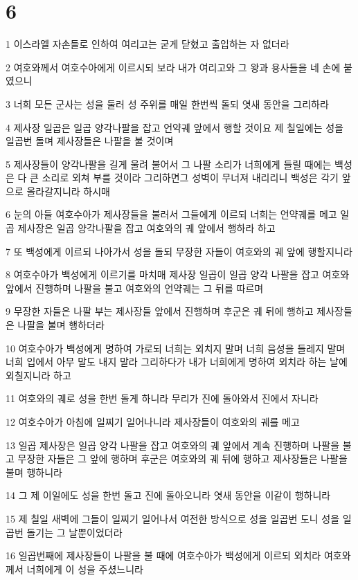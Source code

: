 \chapter{6}

\par 1 이스라엘 자손들로 인하여 여리고는 굳게 닫혔고 출입하는 자 없더라
\par 2 여호와께서 여호수아에게 이르시되 보라 내가 여리고와 그 왕과 용사들을 네 손에 붙였으니
\par 3 너희 모든 군사는 성을 둘러 성 주위를 매일 한번씩 돌되 엿새 동안을 그리하라
\par 4 제사장 일곱은 일곱 양각나팔을 잡고 언약궤 앞에서 행할 것이요 제 칠일에는 성을 일곱번 돌며 제사장들은 나팔을 불 것이며
\par 5 제사장들이 양각나팔을 길게 울려 불어서 그 나팔 소리가 너희에게 들릴 때에는 백성은 다 큰 소리로 외쳐 부를 것이라 그리하면그 성벽이 무너져 내리리니 백성은 각기 앞으로 올라갈지니라 하시매
\par 6 눈의 아들 여호수아가 제사장들을 불러서 그들에게 이르되 너희는 언약궤를 메고 일곱 제사장은 일곱 양각나팔을 잡고 여호와의 궤 앞에서 행하라 하고
\par 7 또 백성에게 이르되 나아가서 성을 돌되 무장한 자들이 여호와의 궤 앞에 행할지니라
\par 8 여호수아가 백성에게 이르기를 마치매 제사장 일곱이 일곱 양각 나팔을 잡고 여호와 앞에서 진행하며 나팔을 불고 여호와의 언약궤는 그 뒤를 따르며
\par 9 무장한 자들은 나팔 부는 제사장들 앞에서 진행하며 후군은 궤 뒤에 행하고 제사장들은 나팔을 불며 행하더라
\par 10 여호수아가 백성에게 명하여 가로되 너희는 외치지 말며 너희 음성을 들레지 말며 너희 입에서 아무 말도 내지 말라 그리하다가 내가 너희에게 명하여 외치라 하는 날에 외칠지니라 하고
\par 11 여호와의 궤로 성을 한번 돌게 하니라 무리가 진에 돌아와서 진에서 자니라
\par 12 여호수아가 아침에 일찌기 일어나니라 제사장들이 여호와의 궤를 메고
\par 13 일곱 제사장은 일곱 양각 나팔을 잡고 여호와의 궤 앞에서 계속 진행하며 나팔을 불고 무장한 자들은 그 앞에 행하며 후군은 여호와의 궤 뒤에 행하고 제사장들은 나팔을 불며 행하니라
\par 14 그 제 이일에도 성을 한번 돌고 진에 돌아오니라 엿새 동안을 이같이 행하니라
\par 15 제 칠일 새벽에 그들이 일찌기 일어나서 여전한 방식으로 성을 일곱번 도니 성을 일곱번 돌기는 그 날뿐이었더라
\par 16 일곱번째에 제사장들이 나팔을 불 때에 여호수아가 백성에게 이르되 외치라 여호와께서 너희에게 이 성을 주셨느니라
